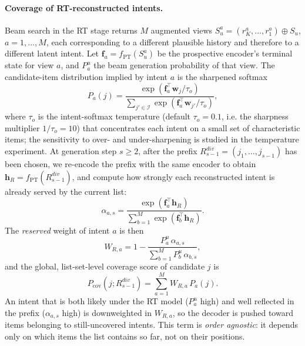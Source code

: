 \paragraph{Coverage of RT-reconstructed intents.}
Beam search in the RT stage returns $M$ augmented views $S_u^{a} = (r^a_K, \ldots, r^a_1) \oplus S_u$, $a=1,\ldots,M$, each corresponding to a different plausible history and therefore to a different latent intent. Let $\mathbf{f}_a = f_{\mathrm{PT}}(S_u^{a})$ be the prospective encoder's terminal state for view $a$, and $P_a^u$ the beam generation probability of that view. The candidate-item distribution implied by intent $a$ is the sharpened softmax
\begin{equation}
\label{eq:pva}
P_a(j)
 = \frac{\exp(\mathbf{f}_a^\top \mathbf{w}_j / \tau_o)}
        {\sum_{j' \in \mathcal{I}} \exp(\mathbf{f}_a^\top \mathbf{w}_{j'} / \tau_o)},
\end{equation}
where $\tau_o$ is the intent-softmax temperature (default $\tau_o=0.1$, i.e. the sharpness multiplier $1/\tau_o=10$) that concentrates each intent on a small set of characteristic items; the sensitivity to over- and under-sharpening is studied in the temperature experiment. At generation step $s \geq 2$, after the prefix $R^{div}_{s-1} = (j_1,\ldots,j_{s-1})$ has been chosen, we re-encode the prefix with the same encoder to obtain $\mathbf{h}_{R} = f_{\mathrm{PT}}(R^{div}_{s-1})$, and compute how strongly each reconstructed intent is already served by the current list:
\begin{equation}
\alpha_{a,s}
 = \frac{\exp(\mathbf{f}_a^\top \mathbf{h}_R)}
        {\sum_{b=1}^{M} \exp(\mathbf{f}_b^\top \mathbf{h}_R)}.
\end{equation}
The \emph{reserved} weight of intent $a$ is then
\begin{equation}
\label{eq:wra}
W_{R,a}
 = 1 - \frac{P_a^u\,\alpha_{a,s}}
             {\sum_{b=1}^{M} P_b^u\,\alpha_{b,s}},
\end{equation}
and the global, list-set-level coverage score of candidate $j$ is
\begin{equation}
\label{eq:pcov}
P_{\mathrm{cov}}(j; R^{div}_{s-1})
 = \sum_{a=1}^{M} W_{R,a}\, P_a(j).
\end{equation}
An intent that is both likely under the RT model ($P_a^u$ high) and well reflected in the prefix ($\alpha_{a,s}$ high) is downweighted in $W_{R,a}$, so the decoder is pushed toward items belonging to still-uncovered intents. This term is \emph{order agnostic}: it depends only on which items the list contains so far, not on their positions.

